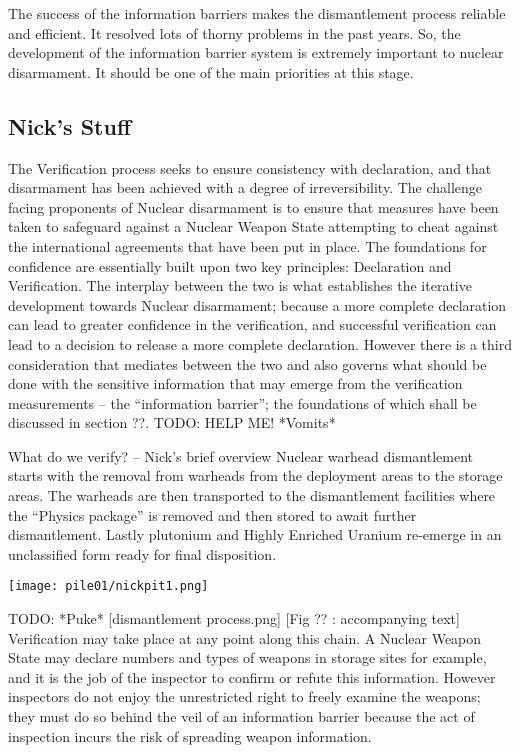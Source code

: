 \documentclass[twoside,titlepage,11pt,twocolumn,a4paper]{article}
\begin{document}
The success of the information barriers makes the dismantlement
process reliable and efficient. It resolved lots of thorny problems in
the past years. So, the development of the information barrier system
is extremely important to nuclear disarmament. It should be one of the
main priorities at this stage.

\subsection{Nick's Stuff}
The Verification process seeks to ensure consistency with declaration,
and that disarmament has been achieved with a degree of
irreversibility.  The challenge facing proponents of Nuclear
disarmament is to ensure that measures have been taken to safeguard
against a Nuclear Weapon State attempting to cheat against the
international agreements that have been put in place. The foundations
for confidence are essentially built upon two key principles:
Declaration and Verification. The interplay between the two is what
establishes the iterative development towards Nuclear disarmament;
because a more complete declaration can lead to greater confidence in
the verification, and successful verification can lead to a decision
to release a more complete declaration. However there is a third
consideration that mediates between the two and also governs what
should be done with the sensitive information that may emerge from the
verification measurements -- the ``information barrier''; the
foundations of which shall be discussed in section ??.
TODO: HELP ME! *Vomits*

What do we verify? -- Nick’s brief overview Nuclear warhead
dismantlement starts with the removal from warheads from the
deployment areas to the storage areas. The warheads are then
transported to the dismantlement facilities where the ``Physics
package'' is removed and then stored to await further
dismantlement. Lastly plutonium and Highly Enriched Uranium re-emerge
in an unclassified form ready for final disposition.

\begin{figure*}
  \texttt{[image: pile01/nickpit1.png]}
\end{figure*}

TODO: *Puke*
[dismantlement process.png] [Fig ?? : accompanying text] \citep{IPFN2009}
Verification may take place at any
point along this chain. A Nuclear Weapon State may declare numbers and
types of weapons in storage sites for example, and it is the job of
the inspector to confirm or refute this information.  However
inspectors do not enjoy the unrestricted right to freely examine the
weapons; they must do so behind the veil of an information barrier
because the act of inspection incurs the risk of spreading weapon
information.
\end{document}
